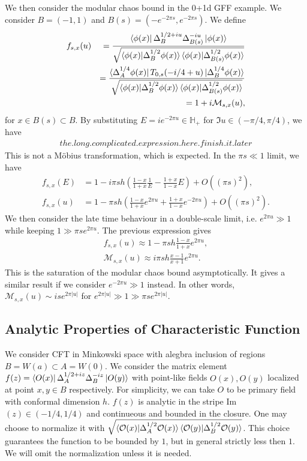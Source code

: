 \documentclass[a4paper,11pt]{article}
\theoremstyle{definition}
\newcommand{\nn}{\nonumber}
\newcommand{\lb}{\left(}
\newcommand{\rb}{\right)}
\newcommand{\mO}{\mathcal{O}}
\newcommand{\mM}{\mathcal{M}}
\begin{document}
We then consider the modular chaos bound in the 0+1d GFF example. We consider $B = (-1,1)$ and $B(s) = (-e^{-2\pi s}, e^{-2\pi s})$. We define
\begin{eqnarray}
    f_{s,x}(u)&&=\frac{\bra{\phi(x)}\Delta_B^{1/2+iu}\Delta_{B(s)}^{-iu}\ket{\phi(x)}}{\sqrt{\braket{\phi(x)|\Delta_B^{1/2}\phi(x)}\braket{\phi(x)|\Delta_{B(s)}^{1/2}\phi(x)}}}\\
    &&=\frac{\bra{\Delta_A^{1/4}\phi(x)} T_{0,s}(-i/4+u)\ket{\Delta_B^{1/4} \phi(x)}}{\sqrt{\braket{\phi(x)|\Delta_B^{1/2}\phi(x)}\braket{\phi(x)|\Delta_{B(s)}^{1/2}\phi(x)}}}\nn\\
    &&=1+i \mathcal{M}_{s,x}(u),
\end{eqnarray}
for $x \in B(s)\subset B$. By substituting $E = ie^{-2\pi u} \in {\mathbb{H}_+}$ for $\Im u \in (-\pi/4,\pi/4)$, we have
\begin{align}
    the.long.complicated.expression.here.finish.it.later
\end{align}
This is not a M\"obius transformation, which is expected. In the $\pi s \ll 1$ limit, we have
\begin{align}
    f_{s,x}(E) &= 1 - i\pi s h\lb \frac{1-x}{1+x}\frac{1}{E} - \frac{1+x}{1-x}E \rb + O((\pi s)^2),\\
    f_{s,x}(u) &= 1 - \pi s h\lb \frac{1-x}{1+x}e^{2\pi u} + \frac{1+x}{1-x}e^{-2\pi u} \rb + O((\pi s)^2).
\end{align}
We then consider the late time behaviour in a double-scale limit, i.e. $e^{2\pi u} \gg1$ while keeping $1\gg\pi se^{2\pi u}$. The previous expression gives
\begin{align} 
    f_{s,x}(u) \approx 1 - \pi s h \frac{1-x}{1+x}e^{2\pi u},\\
    \mM_{s,x}(u)\approx i\pi s h \frac{x-1}{x+1}e^{2\pi u}.
\end{align}
This is the saturation of the modular chaos bound asymptotically. It gives a similar result if we consider $e^{-2\pi u} \gg1$ instead. In other words, $\mM_{s,x}(u) \sim ise^{2\pi |u|}$ for $e^{2\pi |u|} \gg 1\gg\pi se^{2\pi |u|}$.


\subsection{Analytic Properties of Characteristic Function}
We consider CFT in Minkowski space with alegbra inclusion of regions $B = W(a) \subset A = W(0)$. We consider the matrix element $f(z)=\bra{O(x)}\Delta_A^{1/2+iz}\Delta_B^{-iz}\ket{O(y)}$ with point-like fields $O(x), O(y)$ localized at point $x,y\in B$ respectively. For simplicity, we can take $O$ to be primary field with conformal dimension $h$. $f(z)$ is analytic in the stripe Im$(z)\in (-1/4,1/4)$ and continueous and bounded in the closure. One may choose to normalize it with $\sqrt{\braket{\mO(x)|\Delta_A^{1/2}\mO(x)}\braket{\mO(y)|\Delta_B^{1/2}\mO(y)}}$. This choice guarantees the function to be bounded by $1$, but in general strictly less then $1$. We will omit the normalization unless it is needed.
\end{document}
